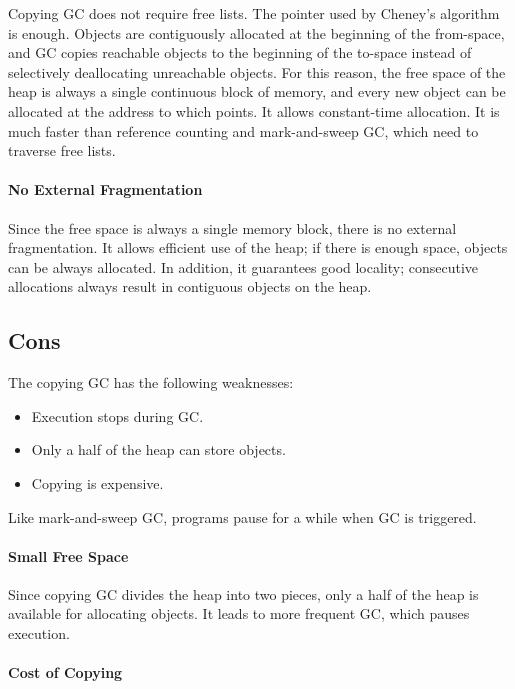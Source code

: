 Copying GC does not require free lists. The  pointer used by Cheney's
algorithm is enough. Objects are contiguously allocated at the beginning of the
from-space, and GC copies reachable objects to the beginning of the to-space
instead of selectively deallocating unreachable objects. For this reason, the
free space of the heap is always a single continuous block of memory, and every
new object can be allocated at the address to which  points. It
allows constant-time allocation. It is much faster than reference counting and
mark-and-sweep GC, which need to traverse free lists.

\paragraph{No External Fragmentation}

Since the free space is always a single memory block, there is no external
fragmentation. It allows efficient use of the heap; if there is enough space,
objects can be always allocated. In addition, it guarantees good locality;
consecutive allocations always result in contiguous objects on the heap.

\subsection{Cons}

The copying GC has the following weaknesses:

\begin{itemize}
  \item Execution stops during GC.
  \item Only a half of the heap can store objects.
  \item Copying is expensive.
\end{itemize}

Like mark-and-sweep GC, programs pause for a while when GC is triggered.

\paragraph{Small Free Space}

Since copying GC divides the heap into two pieces, only a half of the heap is
available for allocating objects. It leads to more frequent GC, which pauses
execution.

\paragraph{Cost of Copying}

